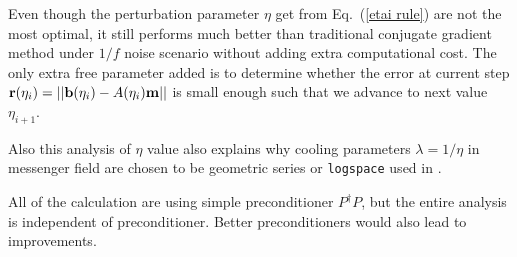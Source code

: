 \documentclass[twocolumn,linenumbers]{aastex631}
\newcommand{\vbd}{\vb{d}}
\newcommand{\vbm}{\vb{m}}
\newcommand{\vbb}{\vb{b}}
\newcommand{\inv}[1]{#1^{-1}}
\newcommand{\hatm}{\vb{\hat{m}}}
\newcommand{\Pdagger}{P^{\dagger}}
\newcommand{\Nbar}{\bar{N}}
\newcommand{\PPinv}[1]{\inv{\qty(\Pdagger #1 P)}}
\begin{document}
%

Even though the perturbation parameter $\eta$ get from Eq.~(\ref{etai rule}) are
not the most optimal,
it still performs much better than traditional conjugate gradient method under
$1/f$ noise scenario without adding extra computational cost.
The only extra free parameter added is to determine whether the error at
current step $\vb{r}(\eta_i) = \qty||\vbb(\eta_i) - A(\eta_i) \vbm||$ is small
enough such that we advance to next value $\eta_{i+1}$.


Also this analysis of $\eta$ value also explains why cooling parameters
$\lambda=1/\eta$ in messenger field are chosen to be geometric series or
\texttt{logspace} used in \cite{Huffenberger_2018}.

All of the calculation are using simple preconditioner $\Pdagger P$, but 
the entire analysis is independent of preconditioner.
Better preconditioners would also lead to improvements.
\end{document}
